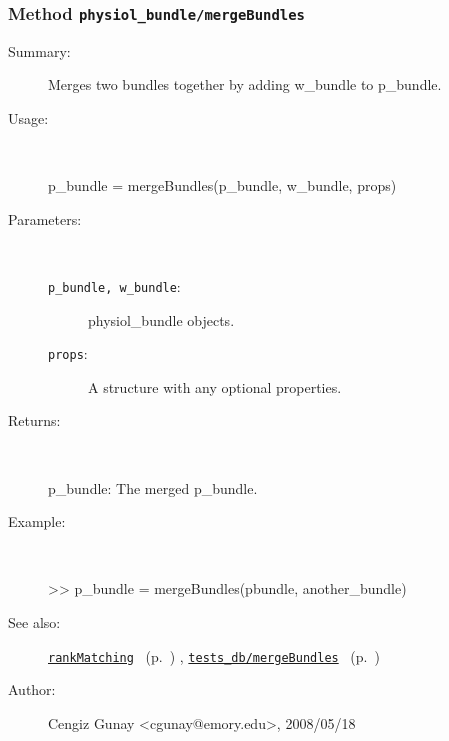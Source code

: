 \subsubsection[Method \texttt{mergeBundles}]{Method \texttt{physiol\_bundle/mergeBundles}}%
%
\label{ref_physiol_bundle__mergeBundles}%
\hypertarget{ref_physiol_bundle__mergeBundles}{}%
\begin{description}
\item[Summary:]Merges two bundles together by adding w\_bundle to p\_bundle.
%
\item[Usage:]~%
\begin{lyxcode}%
p\_bundle = mergeBundles(p\_bundle, w\_bundle, props)
%
\end{lyxcode}%
%
%
\item[Parameters:]~
\begin{description}%
\item[\texttt{p\_bundle, w\_bundle}:]
 physiol\_bundle objects.
\item[\texttt{props}:]
 A structure with any optional properties.
\end{description}%
%
\item[Returns:
]~

	p\_bundle: The merged p\_bundle.
%
\item[Example:]~
\begin{lyxcode} >> p\_bundle = mergeBundles(pbundle, another\_bundle)
\\%
\end{lyxcode}
%
\item[See also:]%
\hyperlink{ref_rankMatching}{\texttt{rankMatching}}%
\ (p.~\pageref{ref_rankMatching})%
%
, \hyperlink{ref_tests_db__mergeBundles}{\texttt{tests\_db/mergeBundles}}%
\ (p.~\pageref{ref_tests_db__mergeBundles})%
%
%
\item[Author:]%
Cengiz Gunay <cgunay@emory.edu>, 2008/05/18
%
\end{description}
\methodline%
